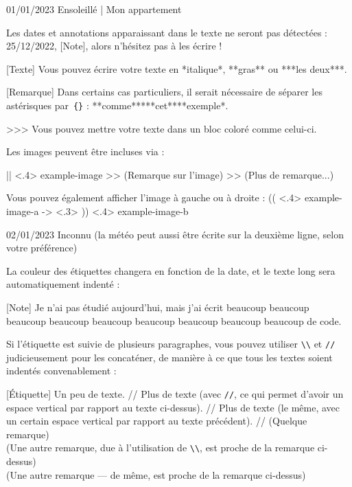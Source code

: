 \documentclass[11pt, paperstyle=light yellow, color entry, day-month-year]{jwjournal}
\begin{document}
01/01/2023 Ensoleillé | Mon appartement

  Les dates et annotations apparaissant dans le texte ne seront pas  détectées : 25/12/2022, [Note], alors n'hésitez pas à les écrire !

  [Texte] Vous pouvez écrire votre texte en *italique*, **gras** ou ***les deux***.

  [Remarque] Dans certains cas particuliers, il serait nécessaire de séparer les astérisques par~\texttt{\{\}} : **comme**{}***cet***{}*exemple*.

  >>> Vous pouvez mettre votre texte dans un bloc coloré comme celui-ci.

  Les images peuvent être incluses via :

  || <.4> {example-image} %
  >> (Remarque sur l'image)
  >> (Plus de remarque...)

  Vous pouvez également afficher l'image à gauche ou à droite :
  (( <.4> {example-image-a} %
  -> <.3> %
  )) <.4> {example-image-b} %



02/01/2023
Inconnu (la météo peut aussi être écrite sur la deuxième ligne, selon votre préférence)

  La couleur des étiquettes changera en fonction de la date, et le texte long sera automatiquement indenté :

  [Note] Je n'ai pas étudié aujourd'hui, mais j'ai écrit beaucoup beaucoup beaucoup beaucoup beaucoup beaucoup beaucoup beaucoup beaucoup de code.

  Si l'étiquette est suivie de plusieurs paragraphes, vous pouvez utiliser \texttt{\textbackslash\textbackslash} et \texttt{\slash\slash} judicieusement pour les concaténer, de manière à ce que tous les textes soient indentés convenablement :

  [Étiquette] Un peu de texte.
    //
    Plus de texte (avec \texttt{\slash\slash}, ce qui permet d'avoir un espace vertical par rapport au texte ci-dessus).
    //
    Plus de texte (le même, avec un certain espace vertical par rapport au texte précédent).
    //
    (Quelque remarque)
    \\
    (Une autre remarque, due à l'utilisation de \texttt{\textbackslash\textbackslash}, est proche de la remarque ci-dessus)
    \\
    (Une autre remarque --- de même, est proche de la remarque ci-dessus)
\end{document}
